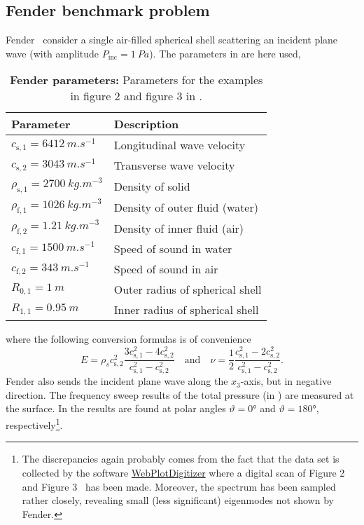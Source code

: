 \subsection{Fender benchmark problem} 
Fender~\cite{Fender1972sfa} consider a single air-filled spherical shell scattering an incident plane wave (with amplitude $P_{\mathrm{inc}}=\SI{1}{Pa}$). The parameters in  are here used,
\begin{table}
	\centering
	\caption{\textbf{Fender parameters:} Parameters for the examples in figure 2 and figure 3 in \cite{Fender1972sfa}.}
	\label{Tab1:Fender}
	\begin{tabular}{l l}
		\toprule
		Parameter & Description\\
		\midrule
		$c_{\mathrm{s},1} = \SI{6412}{m.s^{-1}}$ & Longitudinal wave velocity\\
		$c_{\mathrm{s},2} = \SI{3043}{m.s^{-1}}$ & Transverse wave velocity\\
		$\rho_{\mathrm{s},1} = \SI{2700}{kg.m^{-3}}$ & Density of solid\\
		$\rho_{\mathrm{f},1} = \SI{1026}{kg.m^{-3}}$ & Density of outer fluid (water)\\
		$\rho_{\mathrm{f},2} = \SI{1.21}{kg.m^{-3}}$ & Density of inner fluid (air)\\
		$c_{\mathrm{f},1} = \SI{1500}{m.s^{-1}}$ & Speed of sound in water\\
		$c_{\mathrm{f},2} = \SI{343}{m.s^{-1}}$ & Speed of sound in air\\
		$R_{0,1} = \SI{1}{m}$ & Outer radius of spherical shell\\
		$R_{1,1} = \SI{0.95}{m}$ & Inner radius of spherical shell\\
		\bottomrule
	\end{tabular}
\end{table}
where the following conversion formulas is of convenience
\begin{equation}
	E = \rho_s c_{\mathrm{s},2}^2\frac{3c_{\mathrm{s},1}^2-4c_{\mathrm{s},2}^2}{c_{\mathrm{s},1}^2-c_{\mathrm{s},2}^2}\quad\text{and}\quad
	\nu = \frac12 \frac{c_{\mathrm{s},1}^2-2c_{\mathrm{s},2}^2}{c_{\mathrm{s},1}^2-c_{\mathrm{s},2}^2}.
\end{equation}
Fender also sends the incident plane wave along the $x_3$-axis, but in negative direction. The frequency sweep results of the total pressure (in ) are measured at the surface. In  the results are found at polar angles $\vartheta=\ang{0}$ and $\vartheta=\ang{180}$, respectively\footnote{The discrepancies again probably comes from the fact that the data set is collected by the software \href{https://automeris.io/WebPlotDigitizer/}{WebPlotDigitizer} where a digital scan of Figure 2 and Figure 3~\cite[pp. 30-31]{Fender1972sfa} has been made. Moreover, the spectrum has been sampled rather closely, revealing small (less significant) eigenmodes not shown by Fender.}.
